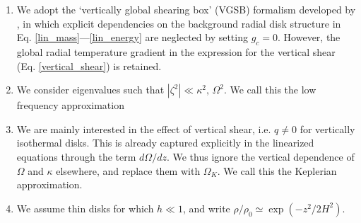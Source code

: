 \begin{enumerate}
  
\item  We adopt the  `vertically global shearing box' (VGSB) formalism 
  developed by , in which explicit dependencies on the
  background radial disk structure in 
  Eq. \ref{lin_mass}---\ref{lin_energy} are neglected by setting
  $\hat{g}_c=0$. However, the global radial temperature 
  gradient in the expression for the 
  vertical shear (Eq. \ref{vertical_shear}) is retained. 

\item We consider eigenvalues such that
  $|\zeta^2|\ll \kappa^2,\,\Omega^2$. We call this the low frequency 
  approximation

\item We are mainly interested in the effect of vertical shear, i.e. $q\neq
  0$ for vertically isothermal disks. This is already captured
  explicitly in the linearized equations through the term
  $d\Omega/dz$. We thus ignore the vertical dependence of $\Omega$ and
  $\kappa$ elsewhere, and replace them with
  $\Omega_K$.  We call this the Keplerian approximation. 
  
\item We assume thin disks for which $h\ll 1$, and write 
  $\rho/\rho_0\simeq  \exp{(-z^2/2H^2)}$. 

\end{enumerate}

